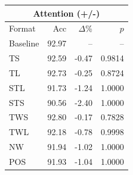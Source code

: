 \begin{tabular}{lrrr}
\toprule
\multicolumn{4}{c}{\textbf{Attention (+/-)}} \\
\midrule
Format & Acc & $\Delta$\% & $p$ \\
\midrule
Baseline & 92.97 & -- & -- \\
\midrule
TS & 92.59 & -0.47 & 0.9814 \\
TL & 92.73 & -0.25 & 0.8724 \\
STL & 91.73 & -1.24 & 1.0000 \\
STS & 90.56 & -2.40 & 1.0000 \\
TWS & 92.80 & -0.17 & 0.7828 \\
TWL & 92.18 & -0.78 & 0.9998 \\
NW & 91.94 & -1.02 & 1.0000 \\
POS & 91.93 & -1.04 & 1.0000 \\
\bottomrule
\end{tabular}